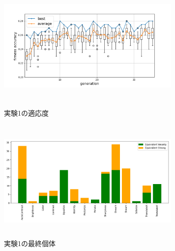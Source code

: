 \documentclass[twocolumn]{jarticle}     %
\begin{document}
\begin{table}[h]
	\centering
	\caption{テスト識別率\label{tb:test}}
\end{table}

\begin{figure}[h]
	\begin{center}
		\vspace*{3mm}
		\hspace*{-12mm}
		\includegraphics[height=65mm,width=90mm]{graph1_1.png}
		\caption{実験1の適応度\label{fig:ex1_1}}
	\end{center}
\end{figure}

\begin{figure}[h]
	\begin{center}
		\vspace*{3mm}
		\hspace*{-12mm}
		\includegraphics[height=60mm,width=90mm]{graph1_2.png}
		\caption{実験1の最終個体\label{fig:ex1_2}}
	\end{center}
\end{figure}
\end{document}
